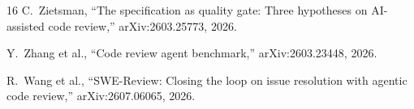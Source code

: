 \documentclass[conference]{IEEEtran}
\begin{document}
\begin{thebibliography}{16}
C.~Zietsman, ``The specification as quality gate: Three hypotheses on
AI-assisted code review,'' arXiv:2603.25773, 2026.

Y.~Zhang et al., ``Code review agent benchmark,'' arXiv:2603.23448, 2026.

R.~Wang et al., ``SWE-Review: Closing the loop on issue resolution with agentic
code review,'' arXiv:2607.06065, 2026.

\end{thebibliography}
\end{document}
